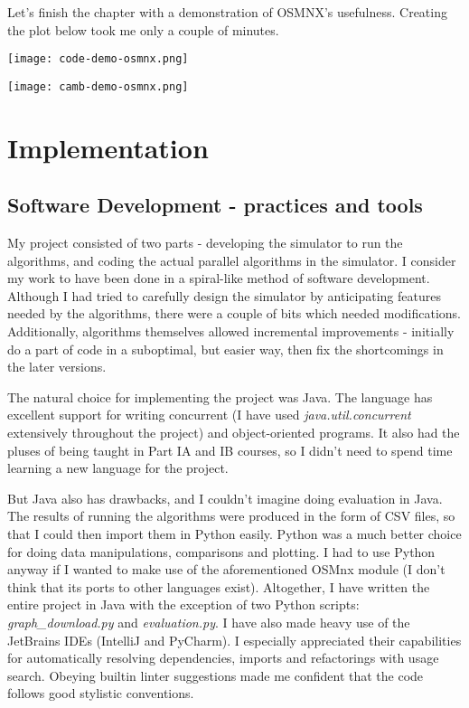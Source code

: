 \documentclass[12pt,a4paper,twoside,openright]{report}
\begin{document}
Let's finish the chapter with a demonstration of OSMNX's usefulness. Creating the plot below took me only a couple of minutes.

\texttt{[image: code-demo-osmnx.png]}
\begin{center}\texttt{[image: camb-demo-osmnx.png]}\end{center}


\chapter{Implementation}

\section{Software Development - practices and tools}
My project consisted of two parts - developing the simulator to run the algorithms, and coding the actual parallel algorithms in the simulator. I consider my work to have been done in a spiral-like method of software development. Although I had tried to carefully design the simulator by anticipating features needed by the algorithms, there were a couple of bits which needed modifications. Additionally, algorithms themselves allowed incremental improvements - initially do a part of code in a suboptimal, but easier way, then fix the shortcomings in the later versions.  

The natural choice for implementing the project was Java. The language has excellent support for writing concurrent (I have used \textit{java.util.concurrent} extensively throughout the project) and object-oriented programs. It also had the pluses of being taught in Part IA and IB courses, so I didn't need to spend time learning a new language for the project.

But Java also has drawbacks, and I couldn't imagine doing evaluation in Java. The results of running the algorithms were produced in the form of CSV files, so that I could then import them in Python easily. Python was a much better choice for doing data manipulations, comparisons and plotting. I had to use Python anyway if I wanted to make use of the aforementioned OSMnx module (I don't think that its ports to other languages exist). Altogether, I have written the entire project in Java with the exception of two Python scripts: \textit{graph\_download.py} and \textit{evaluation.py}. I have also made heavy use of the JetBrains IDEs (IntelliJ and PyCharm). I especially appreciated their capabilities for automatically resolving dependencies, imports and refactorings with usage search. Obeying builtin linter suggestions made me confident that the code follows good stylistic conventions.
\end{document}
